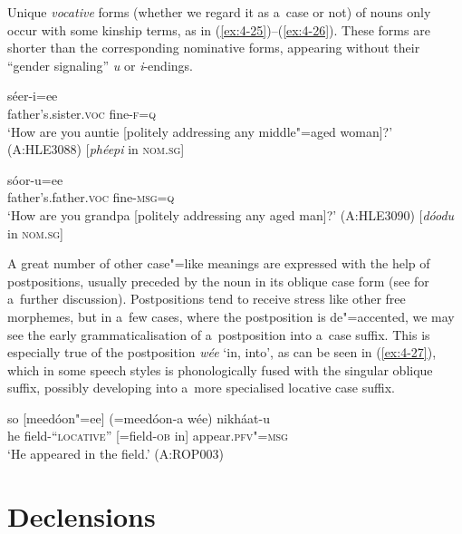 Unique \textit{vocative} forms (whether we regard it as a~case or not) of nouns only occur with some kinship terms, as in (\ref{ex:4-25})--(\ref{ex:4-26}). These forms are shorter than the corresponding nominative forms, appearing without their ``gender signaling'' \textit{u} or \textit{i}-endings.


\begin{exe}
\ex
\label{ex:4-25}
\gll [phéep] séer-i=ee \\
	father's.sister.\textsc{voc} fine-\textsc{f=q} \\
\glt `How are you auntie [politely addressing any middle"=aged woman]?' (A:HLE3088) [\textit{phéepi} in \textsc{nom.sg}]
\end{exe}

\begin{exe}
\ex
\label{ex:4-26}
 \gll [dóod] sóor-u=ee \\
	father's.father.\textsc{voc} fine-\textsc{msg=q} \\
\glt `How are you grandpa [politely addressing any aged man]?' (A:HLE3090) [\textit{dóodu} in \textsc{nom.sg}]
\end{exe}

A great number of other case"=like meanings are expressed with the help of postpositions, usually
preceded by the noun in its oblique case form (see  for a~further discussion). Postpositions
tend to receive stress like other free morphemes, but in a~few cases, where the postposition is
de"=accented, we may see the early grammaticalisation of a~postposition into a~case suffix. This is
especially true of the postposition \textit{wée} `in, into', as can be seen in (\ref{ex:4-27}),
which in some speech styles is phonologically fused with the singular oblique suffix, possibly
developing into a~more specialised locative case suffix.

\begin{exe}
\ex
\label{ex:4-27}
 \gll so [meedóon"=ee] (=meedóon-a wée) nikháat-u \\
	he field\textsc{-``locative''} [=field-\textsc{ob} in] appear.\textsc{pfv"=msg} \\
\glt `He appeared in the field.' (A:ROP003)
\end{exe}

\section{Declensions}
\label{sec:4-6}

